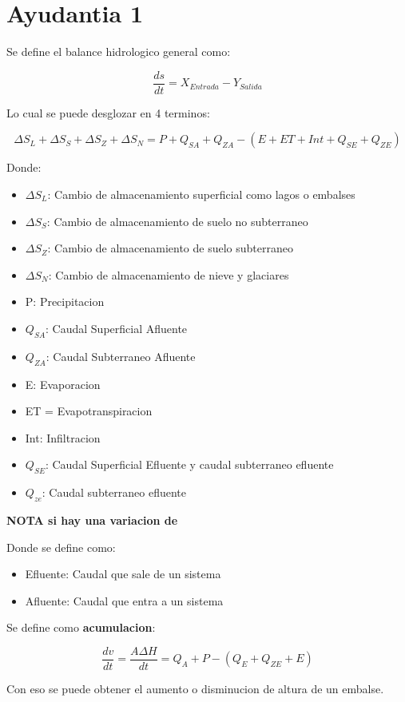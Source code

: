\part{Ayudantia 1}

Se define el balance hidrologico general como:

\begin{equation}
    \frac{ds}{dt} = X_{Entrada}-Y_{Salida}
\end{equation}

Lo cual se puede desglozar en 4 terminos:

\begin{equation}
    \Delta S_L + \Delta S_S + \Delta S_Z + \Delta S_N = P + Q_{SA} + Q_{ZA} - (E +ET +Int + Q_{SE} + Q_{ZE})
\end{equation}

Donde:

\begin{itemize}
    \item $\Delta S_L$: Cambio de almacenamiento superficial como lagos o embalses
    \item $\Delta S_S$: Cambio de almacenamiento de suelo no subterraneo
    \item $\Delta S_Z$: Cambio de almacenamiento de suelo subterraneo
    \item $\Delta S_N$: Cambio de almacenamiento de nieve y glaciares
    \item P: Precipitacion
    \item $Q_{SA}$: Caudal Superficial Afluente
    \item $Q_{ZA}$: Caudal Subterraneo Afluente
    \item E: Evaporacion
    \item ET = Evapotranspiracion
    \item Int: Infiltracion
    \item $Q_{SE}$: Caudal Superficial Efluente y caudal subterraneo efluente
    \item $Q_{ze}$: Caudal subterraneo efluente
\end{itemize}

\textbf{NOTA si hay una variacion de}

Donde se define como:

\begin{itemize}
    \item Efluente: Caudal que sale de un sistema
    \item Afluente: Caudal que entra a un sistema
\end{itemize}

Se define como \textbf{acumulacion}:

\begin{equation}
    \frac{dv}{dt} = \frac{A\Delta H}{dt}= Q_A + P - (Q_E + Q_{ZE} + E)
\end{equation}

Con eso se puede obtener el aumento o disminucion de altura de un embalse.